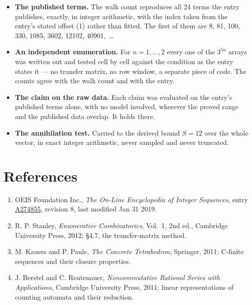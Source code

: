 \documentclass[11pt]{article}
\theoremstyle{definition}
\begin{document}
\begin{itemize}

\item {\bfseries The published terms.} The walk count reproduces all 24 terms the entry publishes, exactly, in integer arithmetic, with the index taken from the entry's stated offset (1) rather than fitted. The first of them are 8, 81, 100, 330, 1085, 3602, 12102, 40901,~\dots

\item {\bfseries An independent enumeration.} For $n = 1,\dots,2$ every one of the $3^{5n}$ arrays was written out and tested cell by cell against the condition as the entry states it --- no transfer matrix, no row window, a separate piece of code. The counts agree with the walk count and with the entry.

\item {\bfseries The claim on the raw data.} Each claim was evaluated on the entry's published terms alone, with no model involved, wherever the proved range and the published data overlap. It holds there.

\item {\bfseries The annihilation test.} Carried to the derived bound $S = 12$ over the whole vector, in exact integer arithmetic, never sampled and never truncated.

\end{itemize}

\section{References}

\begin{enumerate}

\item OEIS Foundation Inc., \emph{The On-Line Encyclopedia of Integer Sequences}, entry \href{https://oeis.org/A274855}{A274855}, revision 8, last modified Jan 31 2019.

\item R. P. Stanley, \emph{Enumerative Combinatorics}, Vol.~1, 2nd ed., Cambridge University Press, 2012; \S4.7, the transfer-matrix method.

\item M. Kauers and P. Paule, \emph{The Concrete Tetrahedron}, Springer, 2011; C-finite sequences and their closure properties.

\item J. Berstel and C. Reutenauer, \emph{Noncommutative Rational Series with Applications}, Cambridge University Press, 2011; linear representations of counting automata and their reduction.

\end{enumerate}
\end{document}

